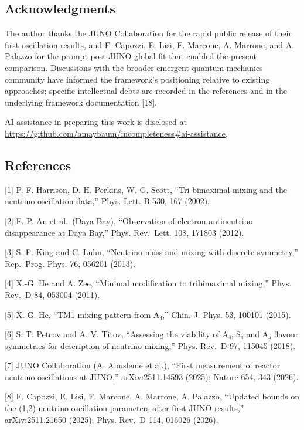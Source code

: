 \documentclass[
]{article}
\begin{document}
\hypertarget{acknowledgments}{%
\subsection{Acknowledgments}\label{acknowledgments}}

The author thanks the JUNO Collaboration for the rapid public release of
their first oscillation results, and F. Capozzi, E. Lisi, F. Marcone, A.
Marrone, and A. Palazzo for the prompt post-JUNO global fit that enabled
the present comparison. Discussions with the broader
emergent-quantum-mechanics community have informed the framework's
positioning relative to existing approaches; specific intellectual debts
are recorded in the references and in the underlying framework
documentation {[}18{]}.

AI assistance in preparing this work is disclosed at\\
\url{https://github.com/amaybaum/incompleteness\#ai-assistance}.

\hypertarget{references}{%
\subsection{References}\label{references}}

{[}1{]} P. F. Harrison, D. H. Perkins, W. G. Scott, ``Tri-bimaximal
mixing and the neutrino oscillation data,'' Phys. Lett. B 530, 167
(2002).

{[}2{]} F. P. An et al.~(Daya Bay), ``Observation of
electron-antineutrino disappearance at Daya Bay,'' Phys. Rev.~Lett. 108,
171803 (2012).

{[}3{]} S. F. King and C. Luhn, ``Neutrino mass and mixing with discrete
symmetry,'' Rep.~Prog. Phys. 76, 056201 (2013).

{[}4{]} X.-G. He and A. Zee, ``Minimal modification to tribimaximal
mixing,'' Phys. Rev.~D 84, 053004 (2011).

{[}5{]} X.-G. He, ``TM1 mixing pattern from A₄,'' Chin. J. Phys. 53,
100101 (2015).

{[}6{]} S. T. Petcov and A. V. Titov, ``Assessing the viability of A₄,
S₄ and A₅ flavour symmetries for description of neutrino mixing,'' Phys.
Rev.~D 97, 115045 (2018).

{[}7{]} JUNO Collaboration (A. Abusleme et al.), ``First measurement of
reactor neutrino oscillations at JUNO,'' arXiv:2511.14593 (2025); Nature
654, 343 (2026).

{[}8{]} F. Capozzi, E. Lisi, F. Marcone, A. Marrone, A. Palazzo,
``Updated bounds on the (1,2) neutrino oscillation parameters after
first JUNO results,'' arXiv:2511.21650 (2025); Phys. Rev.~D 114, 016026
(2026).
\end{document}
